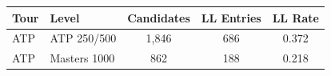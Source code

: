 \begin{tabular}{llccc}
\toprule
Tour & Level & Candidates & LL Entries & LL Rate \\
\midrule
ATP & ATP 250/500 & 1,846 & 686 & 0.372 \\
ATP & Masters 1000 & 862 & 188 & 0.218 \\
\bottomrule
\end{tabular}
